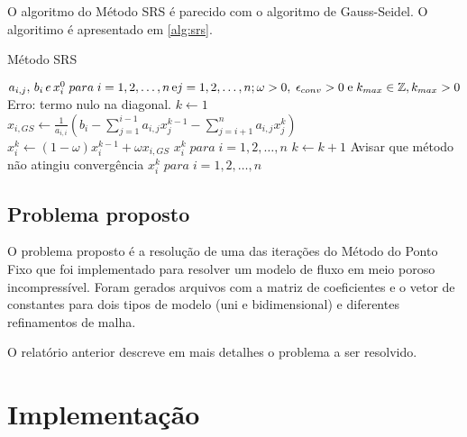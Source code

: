 \documentclass[final,5p]{elsarticle}
\numberwithin{equation}{section}
\begin{document}
        O algoritmo do Método SRS é parecido com o algoritmo de Gauss-Seidel. O algoritimo é apresentado em \ref{alg:srs}.

        \begin{algorithm}
            \caption{Método SRS}\label{alg:srs}
            \begin{algorithmic}
                \Require $a_{i,j},\,b_i\,e\, x_i^0\; para \; i=1,2,\ldots,n\,\text{e}\\j=1,2,\ldots,n;\\\omega > 0,\; \epsilon_{conv} > 0\;\text{e}\; k_{max} \in \mathbb{Z}, k_{max} > 0$
                        \State \Return Erro: termo nulo na diagonal.
                    \EndIf
                \EndFor
                \State $k \gets 1$
                        \State $x_{i,GS} \gets \frac{1}{a_{i,i}} \left( b_i - \sum^{i-1}_{j=1} a_{i,j} x_j^{k-1} - \sum^{n}_{j=i+1} a_{i,j} x_j^{k} \right)$
                        \State $x_i^k \gets (1 - \omega) x_i^{k-1} + \omega x_{i,GS}$
                    \EndFor
                        \State \Return $x_i^k \; para \; i=1,2,\ldots,n$
                    \EndIf
                    \State $k \gets k+1$
                \EndWhile
                \State Avisar que método não atingiu convergência
                \State \Return $x_i^k \; para \; i=1,2,\ldots,n$
            \end{algorithmic}
        \end{algorithm}

    \subsection{Problema proposto}

        O problema proposto é a resolução de uma das iterações do Método do Ponto Fixo que foi implementado para resolver um modelo de fluxo em meio poroso incompressível. Foram gerados arquivos com a matriz de coeficientes e o vetor de constantes para dois tipos de modelo (uni e bidimensional) e diferentes refinamentos de malha.

        O relatório anterior\cite{relatoriogauss} descreve em mais detalhes o problema a ser resolvido.

\section{Implementação} \label{sec:implementacao}
\end{document}
